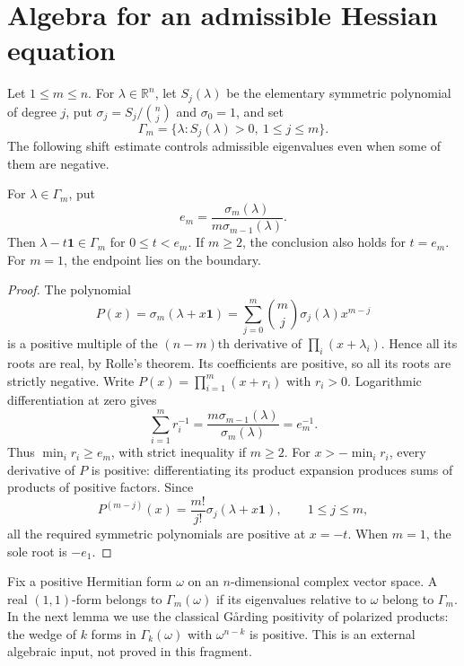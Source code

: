 \section{Algebra for an admissible Hessian equation}

Let $1\leq m\leq n$. For $\lambda\in\mathbb R^n$, let $S_j(\lambda)$ be the elementary symmetric polynomial of degree $j$, put $\sigma_j=S_j/\binom nj$ and $\sigma_0=1$, and set
\[
 \Gamma_m=\{\lambda:S_j(\lambda)>0,\ 1\leq j\leq m\}.
\]
The following shift estimate controls admissible eigenvalues even when some of them are negative.

\begin{lemma}\label{draft:595-hessian-cone-shift}
For $\lambda\in\Gamma_m$, put
\[
 e_m=\frac{\sigma_m(\lambda)}{m\sigma_{m-1}(\lambda)}.
\]
Then $\lambda-t\mathbf1\in\Gamma_m$ for $0\leq t<e_m$. If $m\geq2$, the conclusion also holds for $t=e_m$. For $m=1$, the endpoint lies on the boundary.
\end{lemma}
\begin{proof}
The polynomial
\[
 P(x)=\sigma_m(\lambda+x\mathbf1)
     =\sum_{j=0}^m\binom mj\sigma_j(\lambda)x^{m-j}
\]
is a positive multiple of the $(n-m)$th derivative of $\prod_i(x+\lambda_i)$. Hence all its roots are real, by Rolle's theorem. Its coefficients are positive, so all its roots are strictly negative. Write $P(x)=\prod_{i=1}^m(x+r_i)$ with $r_i>0$. Logarithmic differentiation at zero gives
\[
 \sum_{i=1}^m r_i^{-1}
       =\frac{m\sigma_{m-1}(\lambda)}{\sigma_m(\lambda)}
       =e_m^{-1}.
\]
Thus $\min_i r_i\geq e_m$, with strict inequality if $m\geq2$. For $x> -\min_i r_i$, every derivative of $P$ is positive: differentiating its product expansion produces sums of products of positive factors. Since
\[
 P^{(m-j)}(x)=\frac{m!}{j!}\sigma_j(\lambda+x\mathbf1),
 \qquad 1\leq j\leq m,
\]
all the required symmetric polynomials are positive at $x=-t$. When $m=1$, the sole root is $-e_1$.
\end{proof}

Fix a positive Hermitian form $\omega$ on an $n$-dimensional complex vector space. A real $(1,1)$-form belongs to $\Gamma_m(\omega)$ if its eigenvalues relative to $\omega$ belong to $\Gamma_m$. In the next lemma we use the classical G\aa rding positivity of polarized products: the wedge of $k$ forms in $\Gamma_k(\omega)$ with $\omega^{n-k}$ is positive. This is an external algebraic input, not proved in this fragment.

